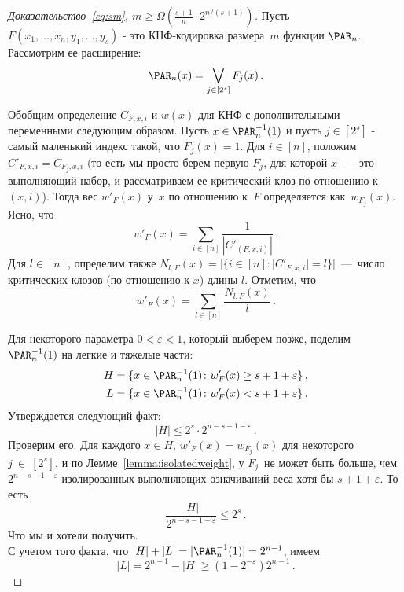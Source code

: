 \begin{proof}[Доказательство~\eqref{eq:sm}, $m \ge \Omega\left(\frac{s+1}{n} \cdot 2^{n/(s+1)}\right)$]
	Пусть $F(x_1, \dotsc, x_n, y_1, \dotsc, y_s)$ - это КНФ-кодировка размера~$m$ функции $\PAR_n$. 
	Рассмотрим ее расширение:
	\[\PAR_n(x)=\bigvee_{j \in [2^s]} F_j(x) \, .\]
	
	Обобщим определение $C_{F,x,i}$ и $w(x)$ для КНФ с дополнительными переменными следующим образом. Пусть $x \in \PAR^{-1}_n(1)$
	и пусть $j \in [2^s]$ - самый маленький индекс такой, что $F_j(x)=1$.
	Для $i \in [n]$, положим $C'_{F,x,i}=C_{F_j,x,i}$ 
	(то есть мы просто берем первую $F_j$, для которой $x$~---~это выполняющий набор, и рассматриваем ее критический клоз по отношению к $(x,i)$).
	Тогда вес $w'_F(x)$ у~$x$ по отношению к~$F$ определяется как~$w_{F_j}(x)$.
	Ясно, что
	\[w'_F(x) = \sum_{i \in [n]} \frac{1}{|C'_{(F,x,i)}|} \,. \]
	Для $l \in [n]$, определим также $N_{l,F}(x)=|\{i \in [n] \colon |C'_{F,x,i}|=l\}|$~---~число критических клозов (по отношению к $x$) длины $l$.
	Отметим, что
	\begin{equation}\label{eq:weight}
		w'_F(x)=\sum_{l \in [n]}\frac{N_{l,F}(x)}{l} \, .
	\end{equation}
	
	
	Для некоторого параметра $0<\varepsilon<1$, который выберем позже, поделим $\PAR_n^{-1}(1)$
	на легкие и тяжелые части:
	\begin{align}
		H &= \{x \in \PAR_n^{-1}(1)  \colon w'_F(x) \ge s + 1 + \varepsilon\} \, ,\\
		L &= \{x \in \PAR_n^{-1}(1)  \colon w'_F(x) < s + 1 + \varepsilon\} \, .
	\end{align}
	Утверждается следующий факт: 
	\[|H| \le 2^s \cdot 2^{n-s-1-\varepsilon} \, .\]
	Проверим его. Для каждого $x \in H$, $w'_F(x)=w_{F_j}(x)$ для некоторого $j~\in~[2^s]$,
	и по Лемме~\ref{lemma:isolatedweight}, у $F_j$~не может быть больше, чем
	$2^{n-s-1-\varepsilon}$ изолированных выполняющих означиваний веса хотя бы
	$s+1+\varepsilon$. То есть
	\[\frac{|H|}{2^{n-s-1-\varepsilon}} \le 2^s \, .\]
	Что мы и хотели получить. \\
	С учетом того факта, что $|H|+|L|=|\PAR^{-1}_n(1)|=2^{n-1}$, имеем
	\begin{equation}\label{eq:lightsize}
		|L|=2^{n-1} -|H| \ge (1 - 2^{-\varepsilon})2^{n-1} \, .
	\end{equation}
	

\end{proof}
